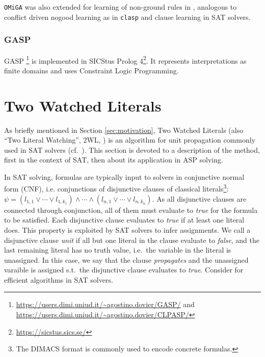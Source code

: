 \documentclass[final]{vutinfth} %
\newcommand{\clasp}{\texttt{clasp}\xspace}
\newcommand{\omiga}{\texttt{OMiGA}\xspace}
\begin{document}
\omiga was also extended for learning of non-ground rules in \cite{nglearn}, analogous to conflict driven nogood learning as in \clasp and clause learning in SAT solvers.

\subsubsection{GASP}

GASP \cite{gasp,gasp2}\footnote{\url{https://users.dimi.uniud.it/~agostino.dovier/GASP/} and\\ \url{https://users.dimi.uniud.it/~agostino.dovier/CLPASP/}} is implemented in SICStus Prolog 4\footnote{\url{https://sicstus.sics.se/}}. It represents interpretations as finite domains and uses Constraint Logic Programming.



\section{Two Watched Literals}
\label{sec:2wl}

As briefly mentioned in Section \ref{sec:motivation}, Two Watched Literals (also \enquote{Two Literal Watching}, 2WL, \cite{effsat,questsat}) is an algorithm for unit propagation commonly used in SAT solvers (cf.~\cite[Section 2.2.2, p.~94]{handbook-sat}). This section is devoted to a description of the method, first in the context of SAT, then about its application in ASP solving.

In SAT solving, formulas are typically input to solvers in conjunctive normal form (CNF), i.e. conjunctions of disjunctive clauses of classical literals\footnote{The DIMACS format is commonly used to encode concrete formulas.}: $\psi = (l_{1,1} \vee \cdots \vee l_{1,k_1}) \wedge \cdots \wedge (l_{n,1} \vee \cdots \vee l_{n,k_n})$. As all disjunctive clauses are connected through conjunction, all of them must evaluate to \emph{true} for the formula to be satisfied. Each disjunctive clause evaluates to \emph{true} if at least one literal does. This property is exploited by SAT solvers to infer assignments. We call a disjunctive clause \emph{unit} if all but one literal in the clause evaluate to \emph{false}, and the last remaining literal has no truth value, i.e.~the variable in the literal is unassigned. In this case, we say that the clause \emph{propagates} and the unassigned varaible is assigned s.t.~the disjunctive clause evaluates to \emph{true}. Consider \cite{ryan} for efficient algorithms in SAT solvers.
\end{document}

